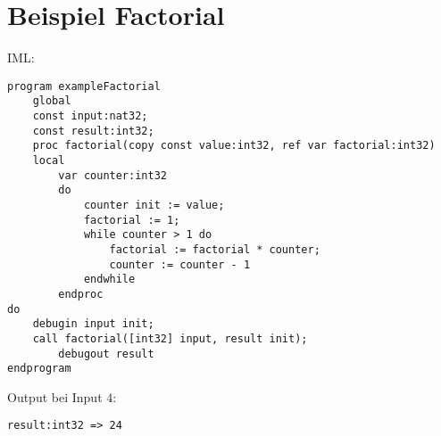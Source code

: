 \documentclass[10pt, a4paper, twocolumn]{article} %
\begin{document}
\clearpage
\section{Beispiel Factorial}
IML:
\begin{lstlisting}
program exampleFactorial
    global
    const input:nat32;
    const result:int32;
    proc factorial(copy const value:int32, ref var factorial:int32)
    local
        var counter:int32
        do
            counter init := value;
            factorial := 1;
            while counter > 1 do
                factorial := factorial * counter;
                counter := counter - 1
            endwhile
        endproc
do
    debugin input init;
    call factorial([int32] input, result init);
        debugout result
endprogram
\end{lstlisting}

Output bei Input $4$:

\texttt{result:int32 => 24} \cmark
\end{document}
